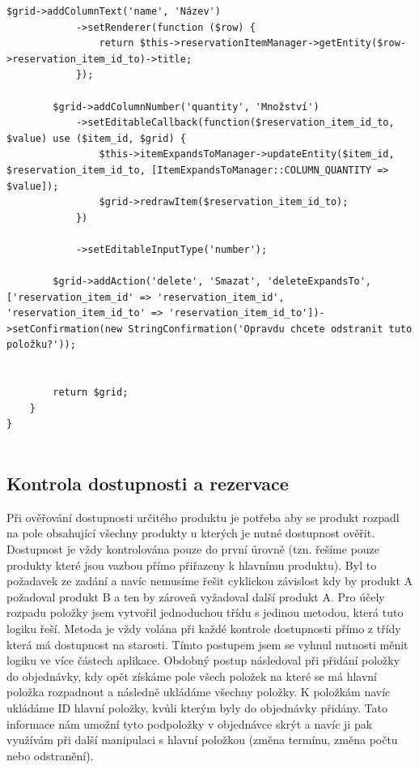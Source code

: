 \begin{lstlisting}[label=src:GenerateStockTakingDocumentFormFactory,caption={Továrna editovatelné tabulky pro správu vazeb produktů}]
        $grid->addColumnText('name', 'Název')
            ->setRenderer(function ($row) {
                return $this->reservationItemManager->getEntity($row->reservation_item_id_to)->title;
            });

        $grid->addColumnNumber('quantity', 'Množství')
            ->setEditableCallback(function($reservation_item_id_to, $value) use ($item_id, $grid) {
                $this->itemExpandsToManager->updateEntity($item_id, $reservation_item_id_to, [ItemExpandsToManager::COLUMN_QUANTITY => $value]);
                $grid->redrawItem($reservation_item_id_to);
            })

            ->setEditableInputType('number');

        $grid->addAction('delete', 'Smazat', 'deleteExpandsTo', ['reservation_item_id' => 'reservation_item_id', 'reservation_item_id_to' => 'reservation_item_id_to'])->setConfirmation(new StringConfirmation('Opravdu chcete odstranit tuto položku?'));


        return $grid;
    }
}


\end{lstlisting}


\subsection{Kontrola dostupnosti a rezervace}

Při ověřování dostupnosti určitého produktu je potřeba aby se produkt rozpadl na pole obsahující všechny produkty u kterých je nutné dostupnost ověřit. Dostupnost je vždy kontrolována pouze do první úrovně (tzn. řešíme pouze produkty které jsou vazbou přímo přiřazeny k hlavnímu produktu). Byl to požadavek ze zadání a navíc nemusíme řešit cyklickou závislost kdy by produkt A požadoval produkt B a ten by zároveň vyžadoval další produkt A.
Pro účely rozpadu položky jsem vytvořil jednoduchou třídu s jedinou metodou, která tuto logiku řeší. Metoda je vždy volána při každé kontrole dostupnosti přímo z třídy která má dostupnost na starosti. Tímto postupem jsem se vyhnul nutnosti měnit logiku ve více částech aplikace.
Obdobný postup následoval při přidání položky do objednávky, kdy opět získáme pole všech položek na které se má hlavní položka rozpadnout a následně ukládáme všechny položky. K položkám navíc ukládáme ID hlavní položky, kvůli kterým byly do objednávky přidány.
Tato informace nám umožní tyto podpoložky v objednávce skrýt a navíc ji pak využívám při další manipulaci s hlavní položkou (změna termínu, změna počtu nebo odstranění).


